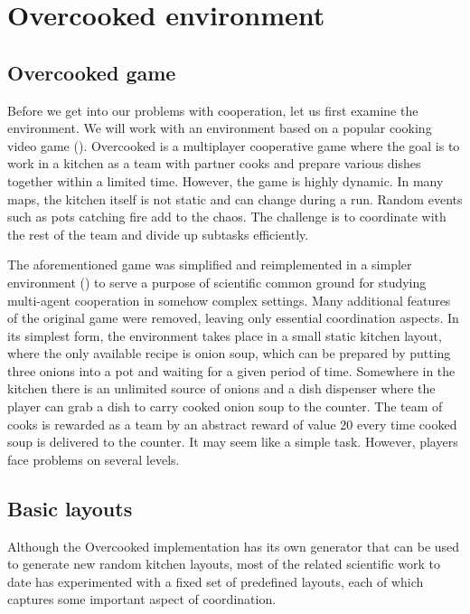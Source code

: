 \chapter{Overcooked environment}

\section{Overcooked game}
Before we get into our problems with cooperation, let us first examine the environment. 
We will work with an environment based on a popular cooking video game (\cite{OvercookedGame}).
Overcooked is a multiplayer cooperative game where the goal is to work in a kitchen as a team with partner cooks and prepare various dishes together within a limited time.
However, the game is highly dynamic. In many maps, the kitchen itself is not static and can change during a run. 
Random events such as pots catching fire add to the chaos. The challenge is to coordinate with the rest of the team and divide up subtasks efficiently.

\par
The aforementioned game was simplified and reimplemented in a simpler environment (\cite{OvercookedImplementation}) to serve a purpose of scientific common ground for studying multi-agent cooperation in somehow complex settings.
Many additional features of the original game were removed, leaving only essential coordination aspects.
In its simplest form, the environment takes place in a small static kitchen layout, where the only available recipe is onion soup, which can be prepared by putting three onions into a pot and waiting for a given period of time.
Somewhere in the kitchen there is an unlimited source of onions and a dish dispenser where the player can grab a dish to carry cooked onion soup to the counter.
The team of cooks is rewarded as a team by an abstract reward of value 20 every time cooked soup is delivered to the counter. 
It may seem like a simple task. However, players face problems on several levels.

\section{Basic layouts}\label{layouts}
Although the Overcooked implementation has its own generator that can be used to generate new random kitchen layouts, most of the related scientific work to date has experimented with a fixed set of predefined layouts, each of which captures some important aspect of coordination.

